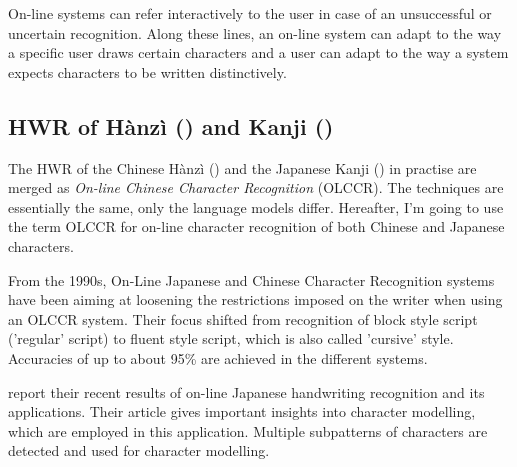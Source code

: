 On-line systems can refer interactively to the user in case of an unsuccessful 
or uncertain recognition. Along these lines, an on-line system can adapt to 
the way a specific user draws certain characters and a user can adapt to the
way a system expects characters to be written distinctively.

\subsection{HWR of Hànzì () and Kanji ()}
\label{sec:hwrofhanziandKanji}


The HWR of the Chinese Hànzì () and the Japanese Kanji () 
in practise are merged as \emph{On-line Chinese Character Recognition} (OLCCR). 
The techniques are essentially the same, only the language models differ. 
Hereafter, I'm going to use the term OLCCR for on-line character recognition of 
both Chinese and Japanese characters.

From the 1990s, On-Line Japanese and Chinese Character Recognition 
systems have been aiming at loosening the restrictions imposed on 
the writer when using an OLCCR system. Their focus shifted from recognition 
of block style script ('regular' script) to fluent style script, 
which is also called 'cursive' style. Accuracies of up to about 95\% are
achieved in the different systems.

 report their recent results of on-line Japanese 
handwriting recognition and its applications. Their article gives 
important insights into character modelling, which are employed in 
this application. Multiple subpatterns of characters are detected and used for
character modelling.

